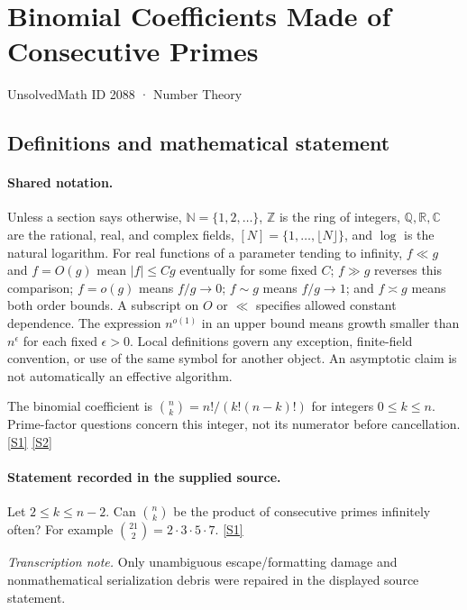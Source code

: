 \documentclass[11pt,a4paper]{article}
\newcommand{\N}{\mathbb{N}}
\newcommand{\Z}{\mathbb{Z}}
\newcommand{\Q}{\mathbb{Q}}
\newcommand{\R}{\mathbb{R}}
\newcommand{\C}{\mathbb{C}}
\newcommand{\sref}[2]{\hyperlink{source:#1:#2}{[S#2]}}
\begin{document}

\setcounter{section}{2087}

\section{Binomial Coefficients Made of Consecutive Primes}\label{2088}

{\small\sffamily UnsolvedMath ID 2088 · Number Theory}

\subsection{Definitions and mathematical statement}

\paragraph{Shared notation.}Unless a section says otherwise, $\N=\{1,2,\ldots\}$,
$\Z$ is the ring of integers, $\Q,\R,\C$ are the rational, real, and complex
fields, $[N]=\{1,\ldots,\lfloor N\rfloor\}$, and $\log$ is the natural
logarithm. For real functions of a parameter tending to infinity,
$f\ll g$ and $f=O(g)$ mean $|f|\leq Cg$ eventually for some fixed $C$;
$f\gg g$ reverses this comparison; $f=o(g)$ means $f/g\to0$;
$f\sim g$ means $f/g\to1$; and $f\asymp g$ means both order bounds.
A subscript on $O$ or $\ll$ specifies allowed constant dependence.
The expression $n^{o(1)}$ in an upper bound means growth smaller than
$n^\epsilon$ for each fixed $\epsilon>0$. Local definitions govern any
exception, finite-field convention, or use of the same symbol for another
object. An asymptotic claim is not automatically an effective algorithm.



The binomial coefficient is $\binom nk=n!/(k!(n-k)!)$ for integers $0\leq k\leq n$. Prime-factor questions concern this integer, not its numerator before cancellation. \sref{2088}{1} \sref{2088}{2}

\paragraph{Statement recorded in the supplied source.}
Let $2\leq k\leq n-2$. Can $\binom{n}{k}$ be the product of consecutive primes infinitely often? For example $ \binom{21}{2}=2\cdot 3\cdot 5\cdot 7. $ \sref{2088}{1}

{\small\emph{Transcription note.} Only unambiguous escape/formatting damage and nonmathematical serialization debris were repaired in the displayed source statement.}
\end{document}
